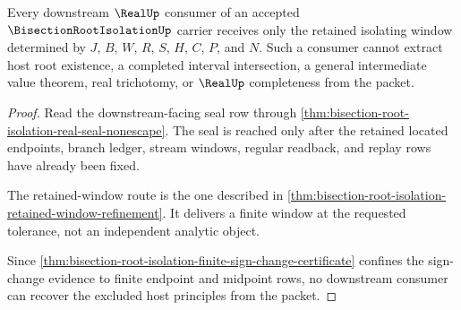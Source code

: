 \begin{theorem}
\label{thm:bisection-root-isolation-downstream-boundary}
Every downstream $\RealUp$ consumer of an accepted $\BisectionRootIsolationUp$ carrier receives only the retained isolating window determined by $J$, $B$, $W$, $R$, $S$, $H$, $C$, $P$, and $N$. Such a consumer cannot extract host root existence, a completed interval intersection, a general intermediate value theorem, real trichotomy, or $\RealUp$ completeness from the packet.
\end{theorem}
\begin{proof}
Read the downstream-facing seal row through \autoref{thm:bisection-root-isolation-real-seal-nonescape}. The seal is reached only after the retained located endpoints, branch ledger, stream windows, regular readback, and replay rows have already been fixed.

The retained-window route is the one described in \autoref{thm:bisection-root-isolation-retained-window-refinement}. It delivers a finite window at the requested tolerance, not an independent analytic object.

Since \autoref{thm:bisection-root-isolation-finite-sign-change-certificate} confines the sign-change evidence to finite endpoint and midpoint rows, no downstream consumer can recover the excluded host principles from the packet.
\end{proof}

